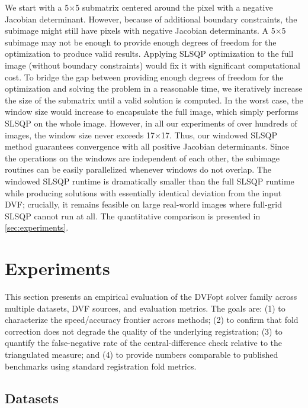 We start with a 5$\times$5 submatrix centered around the pixel with a negative Jacobian determinant. However, because of additional boundary constraints, the subimage might still have pixels with negative Jacobian determinants. A 5$\times$5 subimage may not be enough to provide enough degrees of freedom for the optimization to produce valid results. Applying SLSQP optimization to the full image (without boundary constraints) would fix it with significant computational cost. To bridge the gap between providing enough degrees of freedom for the optimization and solving the problem in a reasonable time, we iteratively increase the size of the submatrix until a valid solution is computed. In the worst case, the window size would increase to encapsulate the full image, which simply performs SLSQP on the whole image. However, in all our experiments of over hundreds of images, the window size never exceeds 17$\times$17. Thus, our windowed SLSQP method guarantees convergence with all positive Jacobian determinants. Since the operations on the windows are independent of each other, the subimage routines can be easily parallelized whenever windows do not overlap. The windowed SLSQP runtime is dramatically smaller than the full SLSQP runtime while producing solutions with essentially identical deviation from the input DVF; crucially, it remains feasible on large real-world images where full-grid SLSQP cannot run at all. The quantitative comparison is presented in \autoref{sec:experiments}.


\section{Experiments}
\label{sec:experiments}

This section presents an empirical evaluation of the DVFopt solver family across multiple datasets, DVF sources, and evaluation metrics. The goals are: (1) to characterize the speed/accuracy frontier across methods; (2) to confirm that fold correction does not degrade the quality of the underlying registration; (3) to quantify the false-negative rate of the central-difference check relative to the triangulated measure; and (4) to provide numbers comparable to published benchmarks using standard registration fold metrics.

\subsection{Datasets}
\label{sec:datasets}

